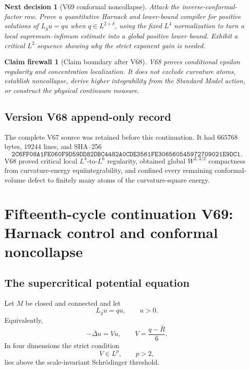 \documentclass[11pt]{article}
\newtheorem{firewall}[theorem]{Claim firewall}
\newtheorem{decision}[theorem]{Next decision}
\theoremstyle{remark}
\begin{document}
\begin{decision}[V69 conformal noncollapse]
\label{dec:v15v68-next}
Attack the inverse-conformal-factor row.  Prove a quantitative
Harnack and lower-bound compiler for positive solutions of
\(L_{\bar g}u=qu\) when \(q\in L^{2+\delta}\), using the fixed
\(L^4\) normalization to turn a local supremum--infimum estimate
into a global positive lower bound.  Exhibit a critical
\(L^2\) sequence showing why the strict exponent gain is needed.
\end{decision}

\begin{firewall}[Claim boundary after V68]
\label{fire:v15v68}
V68 proves conditional epsilon regularity and concentration
localization.  It does not exclude curvature atoms, establish
noncollapse, derive higher integrability from the Standard Model
action, or construct the physical continuum measure.
\end{firewall}

\section*{Version V68 append-only record}
The complete V67 source was retained before this continuation.  It
had \(665768\) bytes, \(19244\) lines, and SHA--256
\[
 \texttt{2C6FF08A1FE060F9D59DD82DBC4482A0CDE3561FE306560545972709021E9DC1}.
\]
V68 proved critical local \(L^4\)-to-\(L^6\) regularity, obtained
global \(W^{2,3/2}\) compactness from curvature-energy
equiintegrability, and confined every remaining conformal-volume
defect to finitely many atoms of the curvature-square energy.

\chapter{Fifteenth-cycle continuation V69: Harnack control and conformal noncollapse}
\label{sec:v15v69}

\section{The supercritical potential equation}

Let \(M\) be closed and connected and let
\[
 L_{\bar g}u=qu,\qquad u>0.                            \tag{69.1}
\]
Equivalently,
\[
 -\bar\Delta u=Vu,\qquad
 V=\frac{q-\bar R}{6}.                                \tag{69.2}
\]
In four dimensions the strict condition
\[
 V\in L^p,\qquad p>2,                                 \tag{69.3}
\]
lies above the scale-invariant Schr\"odinger threshold.
\end{document}
